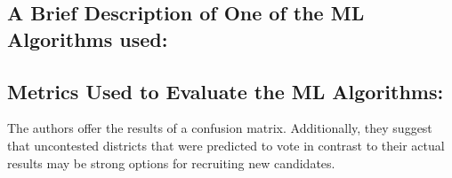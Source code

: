 \documentclass[]{article}
\begin{document}
\subsection*{A Brief Description of One of the ML Algorithms used:}


\subsection*{Metrics Used to Evaluate the ML Algorithms:}
The authors offer the results of a confusion matrix. Additionally, they suggest that uncontested districts that were predicted to vote in contrast to their actual results may be strong options for recruiting new candidates.
\end{document}
